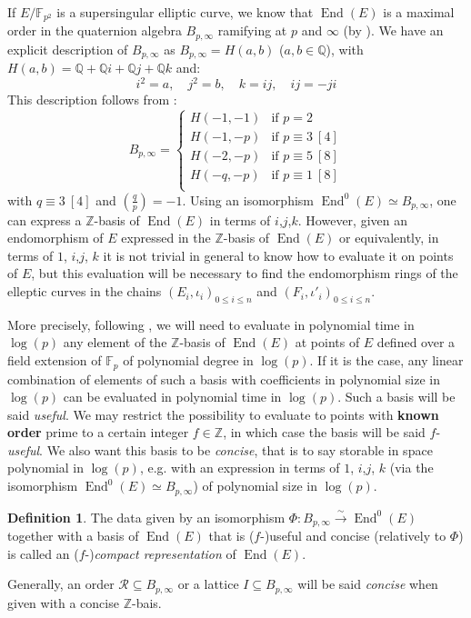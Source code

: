 \documentclass[a4paper,10pt]{report}
\theoremstyle{definition}
\newtheorem{definition}{Definition}[chapter]
\theoremstyle{plain}
\theoremstyle{definition}
\newcommand{\Z}{\mathbb{Z}}
\newcommand{\Q}{\mathbb{Q}}
\newcommand{\F}{\mathbb{F}}
\newcommand{\m}[1]{\mathcal{#1}}
\renewcommand{\(}{\left(}
\renewcommand{\)}{\right)}
\DeclareMathOperator{\End}{End}
\begin{document}
If $E/\F_{p^2}$ is a supersingular elliptic curve, we know that $\End(E)$ is a maximal order in the quaternion algebra $B_{p,\infty}$ ramifying at $p$ and $\infty$ (by \cite[theorem 42.1.9]{Voight}).  We have an explicit description of $B_{p,\infty}$ as $B_{p,\infty}=H(a,b)$ ($a,b\in\Q$), with $H(a,b)=\Q+\Q i+\Q j+\Q k$ and:
\[i^2=a, \quad j^2=b, \quad k=ij,\quad ij=-ji\]
This description follows from \cite[proposition 5.1]{Pizer80}:
\[B_{p,\infty}=\left\{\begin{array}{cl}
H(-1,-1) & \mbox{if } p=2\\
H(-1,-p) & \mbox{if } p\equiv 3 \ [4]\\
H(-2,-p)  & \mbox{if } p\equiv 5 \ [8]\\
H(-q,-p)  & \mbox{if } p\equiv 1 \ [8]\\
\end{array}\right.\]
with $q\equiv 3 \ [4]$ and $\(\frac{q}{p}\)=-1$. Using an isomorphism $\End^0(E)\simeq B_{p,\infty}$, one can express a $\Z$-basis of $\End(E)$ in terms of $i$,$j$,$k$. However, given an endomorphism of $E$ expressed in the $\Z$-basis of $\End(E)$ or equivalently, in terms of $1$, $i$,$j$, $k$ it is not trivial in general to know how to evaluate it on points of $E$, but this evaluation will be necessary to find the endomorphism rings of the elleptic curves in the chains  $(E_i,\iota_i)_{0\leq i\leq n}$ and $(F_i,\iota'_i)_{0\leq i\leq n}$. 

More precisely, following \cite{LP_merged}, we will need to evaluate in polynomial time in $\log(p)$ any element of the $\Z$-basis of $\End(E)$ at points of $E$ defined over a field extension of $\F_p$ of polynomial degree in $\log(p)$. If it is the case,  any linear combination of elements of such a basis with coefficients in polynomial size in $\log(p)$ can be evaluated in polynomial time in $\log(p)$.  Such a basis will be said \emph{useful}.  We may restrict the possibility to evaluate to points with \textbf{known order} prime to a certain integer $f\in\Z$,  in which case the basis will be said $f$-\emph{useful}. We also want this basis to be \emph{concise}, that is to say storable in space polynomial in $\log(p)$, e.g. with an expression in terms of $1$, $i$,$j$, $k$ (via the isomorphism $\End^0(E)\simeq B_{p,\infty}$) of polynomial size in $\log(p)$. 

\begin{definition}
The data given by an isomorphism $\Phi : B_{p,\infty} \overset{\sim}{\longrightarrow}\End^0(E)$ together with a basis of $\End(E)$ that is ($f$-)useful and concise (relatively to $\Phi$) is called an ($f$-)\emph{compact representation} of $\End(E)$.

Generally, an order $\m{R}\subseteq B_{p,\infty}$ or a lattice $I\subseteq B_{p,\infty}$ will be said \emph{concise} when given with a concise $\Z$-bais.
\end{definition}
\end{document}
